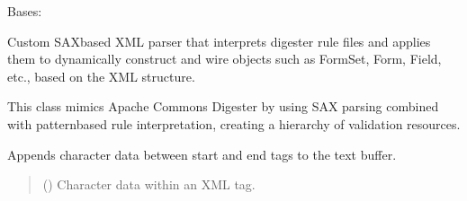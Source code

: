 \documentclass[letterpaper,10pt,english]{sphinxmanual}
\begin{document}
\begin{fulllineitems}
\label{\detokenize{apache_commons_validator_python.util:apache_commons_validator_python.util.digester.Digester}}
\pysigstartsignatures
{}
\pysigstopsignatures
\sphinxAtStartPar
Bases: 

\sphinxAtStartPar
Custom SAX\sphinxhyphen{}based XML parser that interprets digester rule files and applies them
to dynamically construct and wire objects such as FormSet, Form, Field, etc.,
based on the XML structure.

\sphinxAtStartPar
This class mimics Apache Commons Digester by using SAX parsing combined with
pattern\sphinxhyphen{}based rule interpretation, creating a hierarchy of validation resources.

\begin{fulllineitems}
\label{\detokenize{apache_commons_validator_python.util:apache_commons_validator_python.util.digester.Digester.characters}}
\pysigstartsignatures
{}
\pysigstopsignatures
\sphinxAtStartPar
Appends character data between start and end tags to the text buffer.
\begin{quote}\begin{description}
\sphinxAtStartPar
{} () \textendash{} Character data within an XML tag.

\end{description}\end{quote}

\end{fulllineitems}



\end{fulllineitems}
\end{document}
